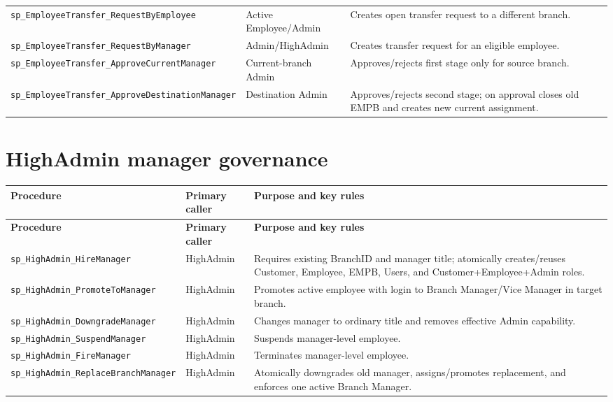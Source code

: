 \documentclass[11pt,a4paper,oneside]{report}
\begin{document}
\begin{longtable}{L{0.30\textwidth}L{0.22\textwidth}L{0.41\textwidth}}
\nolinkurl{sp_EmployeeTransfer_RequestByEmployee} & Active Employee\slash Admin & Creates open transfer request to a different branch.\\
\nolinkurl{sp_EmployeeTransfer_RequestByManager} & Admin\slash HighAdmin & Creates transfer request for an eligible employee.\\
\nolinkurl{sp_EmployeeTransfer_ApproveCurrentManager} & Current-branch Admin & Approves\slash rejects first stage only for source branch.\\
\nolinkurl{sp_EmployeeTransfer_ApproveDestinationManager} & Destination Admin & Approves\slash rejects second stage; on approval closes old EMPB and creates new current assignment.\\
\bottomrule
\end{longtable}
\endgroup
\section{HighAdmin manager governance}
\begingroup
\footnotesize
\setlength{\tabcolsep}{4pt}
\renewcommand{\arraystretch}{1.08}
\begin{longtable}{L{0.30\textwidth}L{0.22\textwidth}L{0.41\textwidth}}
\toprule\textbf{Procedure} & \textbf{Primary caller} & \textbf{Purpose and key rules}\\\midrule\endfirsthead
\toprule\textbf{Procedure} & \textbf{Primary caller} & \textbf{Purpose and key rules}\\\midrule\endhead
\nolinkurl{sp_HighAdmin_HireManager} & HighAdmin & Requires existing BranchID and manager title; atomically creates\slash reuses Customer, Employee, EMPB, Users, and Customer+Employee+Admin roles.\\
\nolinkurl{sp_HighAdmin_PromoteToManager} & HighAdmin & Promotes active employee with login to Branch Manager\slash Vice Manager in target branch.\\
\nolinkurl{sp_HighAdmin_DowngradeManager} & HighAdmin & Changes manager to ordinary title and removes effective Admin capability.\\
\nolinkurl{sp_HighAdmin_SuspendManager} & HighAdmin & Suspends manager-level employee.\\
\nolinkurl{sp_HighAdmin_FireManager} & HighAdmin & Terminates manager-level employee.\\
\nolinkurl{sp_HighAdmin_ReplaceBranchManager} & HighAdmin & Atomically downgrades old manager, assigns\slash promotes replacement, and enforces one active Branch Manager.\\
\bottomrule
\end{longtable}
\endgroup
\end{document}
